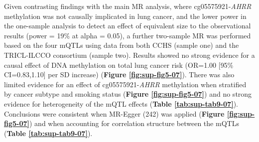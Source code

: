 \documentclass[11pt,twoside]{bristolthesis}
\begin{document}
\begin{table}[!h]

\caption{\label{tab:sup-tab8-07}One-sample MR analysis of the effect of \textit{AHRR} methylation (\%) on lung cancer risk in the CCHS}
\centering
{}
\end{table}
\linebreak

Given contrasting findings with the main MR analysis, where cg05575921-\emph{AHRR} methylation was not causally implicated in lung cancer, and the lower power in the one-sample analysis to detect an effect of equivalent size to the observational results (power = 19\% at alpha = 0.05), a further two-sample MR was performed based on the four mQTLs using data from both CCHS (sample one) and the TRICL-ILCCO consortium (sample two). Results showed no strong evidence for a causal effect of DNA methylation on total lung cancer risk (OR=1.00 {[}95\% CI=0.83,1.10{]} per SD increase) (\textbf{Figure \ref{fig:sup-fig5-07}}). There was also limited evidence for an effect of cg05575921-\emph{AHRR} methylation when stratified by cancer subtype and smoking status (\textbf{Figure \ref{fig:sup-fig5-07}}) and no strong evidence for heterogeneity of the mQTL effects (\textbf{Table \ref{tab:sup-tab9-07}}). Conclusions were consistent when MR-Egger (242) was applied (\textbf{Figure \ref{fig:sup-fig5-07}}) and when accounting for correlation structure between the mQTLs (\textbf{Table \ref{tab:sup-tab9-07}}).
\end{document}
